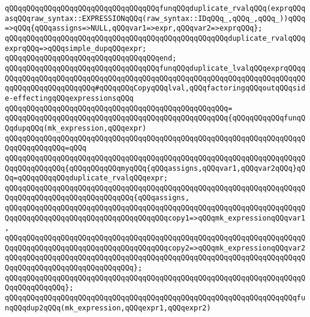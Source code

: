 \newline
\verb|qQQqqQQqqQQqqQQqqQQqqQQqqQQqqQQqqQQqfunqQQqduplicate_rvalqQQq(exprqQQqasqQQqraw_syntax::EXPRESSIONqQQq(raw_syntax::IDqQQq_,qQQq_,qQQq_))qQQq=>qQQq{qQQqassigns=>NULL,qQQqvar1=>expr,qQQqvar2=>exprqQQq};|\newline
\verb|qQQqqQQqqQQqqQQqqQQqqQQqqQQqqQQqqQQqqQQqqQQqqQQqqQQqduplicate_rvalqQQqexprqQQq=>qQQqsimple_dupqQQqexpr;|\newline
\verb|qQQqqQQqqQQqqQQqqQQqqQQqqQQqqQQqqQQqend;|\newline
\newline
\verb|qQQqqQQqqQQqqQQqqQQqqQQqqQQqqQQqqQQqfunqQQqduplicate_lvalqQQqexprqQQqqQQqqQQqqQQqqQQqqQQqqQQqqQQqqQQqqQQqqQQqqQQqqQQqqQQqqQQqqQQqqQQqqQQqqQQqqQQqqQQqqQQqqQQqqQQq#qQQqqQQqCopyqQQqlval,qQQqfactoringqQQqoutqQQqside-effectingqQQqexpressionsqQQq|\newline
\verb|qQQqqQQqqQQqqQQqqQQqqQQqqQQqqQQqqQQqqQQqqQQqqQQqqQQq=|\newline
\verb|qQQqqQQqqQQqqQQqqQQqqQQqqQQqqQQqqQQqqQQqqQQqqQQqqQQq{qQQqqQQqqQQqfunqQQqdupqQQq(mk_expression,qQQqexpr)|\newline
\verb|qQQqqQQqqQQqqQQqqQQqqQQqqQQqqQQqqQQqqQQqqQQqqQQqqQQqqQQqqQQqqQQqqQQqqQQqqQQqqQQqqQQq=qQQq|\newline
\verb|qQQqqQQqqQQqqQQqqQQqqQQqqQQqqQQqqQQqqQQqqQQqqQQqqQQqqQQqqQQqqQQqqQQqqQQqqQQqqQQqqQQq{qQQqqQQqqQQqmyqQQq{qQQqassigns,qQQqvar1,qQQqvar2qQQq}qQQq=qQQqqQQqqQQqduplicate_rvalqQQqexpr;|\newline
\newline
\verb|qQQqqQQqqQQqqQQqqQQqqQQqqQQqqQQqqQQqqQQqqQQqqQQqqQQqqQQqqQQqqQQqqQQqqQQqqQQqqQQqqQQqqQQqqQQqqQQqqQQq{qQQqassigns,|\newline
\verb|qQQqqQQqqQQqqQQqqQQqqQQqqQQqqQQqqQQqqQQqqQQqqQQqqQQqqQQqqQQqqQQqqQQqqQQqqQQqqQQqqQQqqQQqqQQqqQQqqQQqqQQqqQQqcopy1=>qQQqmk_expressionqQQqvar1,|\newline
\verb|qQQqqQQqqQQqqQQqqQQqqQQqqQQqqQQqqQQqqQQqqQQqqQQqqQQqqQQqqQQqqQQqqQQqqQQqqQQqqQQqqQQqqQQqqQQqqQQqqQQqqQQqqQQqcopy2=>qQQqmk_expressionqQQqvar2|\newline
\verb|qQQqqQQqqQQqqQQqqQQqqQQqqQQqqQQqqQQqqQQqqQQqqQQqqQQqqQQqqQQqqQQqqQQqqQQqqQQqqQQqqQQqqQQqqQQqqQQqqQQq};|\newline
\verb|qQQqqQQqqQQqqQQqqQQqqQQqqQQqqQQqqQQqqQQqqQQqqQQqqQQqqQQqqQQqqQQqqQQqqQQqqQQqqQQqqQQq};|\newline
\newline
\verb|qQQqqQQqqQQqqQQqqQQqqQQqqQQqqQQqqQQqqQQqqQQqqQQqqQQqqQQqqQQqqQQqqQQqfunqQQqdup2qQQq(mk_expression,qQQqexpr1,qQQqexpr2)|\newline
